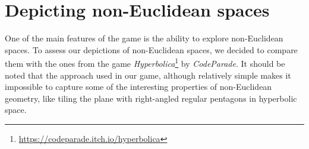 \section{Depicting non-Euclidean spaces}
One of the main features of the game is the ability to explore non-Euclidean spaces.
To assess our depictions of non-Euclidean spaces, we decided to compare them with the ones from the game \textit{Hyperbolica}\footnote{\url{https://codeparade.itch.io/hyperbolica}} by \textit{CodeParade}.
It should be noted that the approach used in our game, although relatively simple makes it impossible to capture some of the interesting properties of non-Euclidean geometry, like tiling the plane with right-angled regular pentagons in hyperbolic space.


